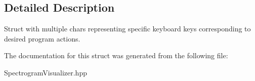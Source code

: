 \subsection{Detailed Description}
Struct with multiple char\textquotesingle{}s representing specific keyboard keys corresponding to desired program actions. 

The documentation for this struct was generated from the following file\+:\begin{DoxyCompactItemize}
\item 
Spectrogram\+Visualizer.\+hpp\end{DoxyCompactItemize}
